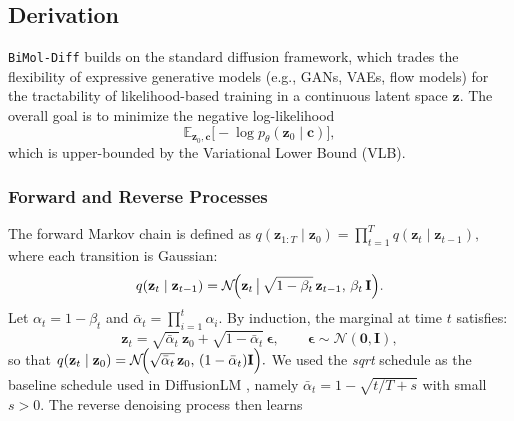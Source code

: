 \subsection{Derivation}\label{sec:derivation_appendix}

\texttt{BiMol-Diff} builds on the standard diffusion framework, which trades the flexibility of expressive generative models (e.g., GANs, VAEs, flow models) for the tractability of likelihood-based training in a continuous latent space $\mathbf{z}$. The overall goal is to minimize the negative log-likelihood
\begin{equation}
    \mathbb{E}_{\mathbf{z}_0,\mathbf{c}}\!\bigl[-\log p_\theta(\mathbf{z}_0 \mid \mathbf{c})\bigr],
\end{equation}
which is upper-bounded by the Variational Lower Bound (VLB).

\subsubsection{Forward and Reverse Processes}

The forward Markov chain is defined as $ q(\mathbf{z}_{1:T} \mid \mathbf{z}_0)
    = \prod_{t=1}^T q(\mathbf{z}_t \mid \mathbf{z}_{t-1}),$
where each transition is Gaussian:
\begin{equation}
    q(\mathbf{z}_t \mid \mathbf{z}_{t-1})
    = \mathcal{N}\!\Bigl(
        \mathbf{z}_t \,\big|\,
        \sqrt{1-\beta_t}\,\mathbf{z}_{t-1},\,
        \beta_t\,\mathbf{I}
    \Bigr).
\end{equation}
Let $\alpha_t = 1-\beta_t$ and $\bar{\alpha}_t = \prod_{i=1}^t \alpha_i$.  
By induction, the marginal at time $t$ satisfies:
\begin{equation}
    \mathbf{z}_t
    = \sqrt{\bar{\alpha}_t}\,\mathbf{z}_0
    + \sqrt{1-\bar{\alpha}_t}\,\boldsymbol{\epsilon},
    \qquad
    \boldsymbol{\epsilon}\sim\mathcal{N}(\mathbf{0},\mathbf{I}),
\end{equation}
so that $ q(\mathbf{z}_t \mid \mathbf{z}_0)
    = \mathcal{N}\!\Bigl(
        \sqrt{\bar{\alpha}_t}\,\mathbf{z}_0,\,
        (1-\bar{\alpha}_t)\mathbf{I}
    \Bigr).$
We used the \textit{sqrt} schedule as the baseline schedule used in DiffusionLM \cite{li2022diffusionlmimprovescontrollabletext}, namely \(\bar\alpha_t=1-\sqrt{t/T+s}\) with small \(s>0\).
The reverse denoising process then learns


